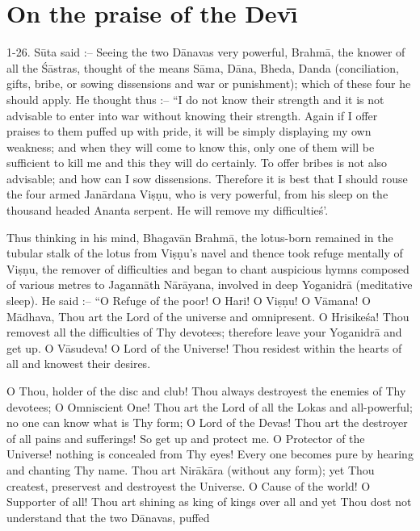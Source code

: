 \chapter{On the praise of the Dev\={\i}}

1-26. S\=uta said :-- Seeing the two D\=anavas very powerful, Brahm\=a, the knower of all the \'S\=astras, thought of the means S\=ama, D\=ana, Bheda, Danda (conciliation, gifts, bribe, or sowing dissensions and war or punishment); which of these four he should apply. He thought thus :-- ``I do not know their strength and it is not advisable to enter into war without knowing their strength. Again if I offer praises to them puffed up with pride, it will be simply displaying my own weakness; and when they will come to know this, only one of them will be sufficient to kill me and this they will do certainly. To offer bribes is not also advisable; and how can I sow dissensions. Therefore it is best that I should rouse the four armed Jan\=ardana Vi\d{s}\d{n}u, who is very powerful, from his sleep on the thousand headed Ananta serpent. He will remove my difficultie\'s'.

Thus thinking in his mind, Bhagav\=an Brahm\=a, the lotus-born remained in the tubular stalk of the lotus from Vi\d{s}\d{n}u's navel and thence took refuge mentally of Vi\d{s}\d{n}u, the remover of difficulties and began to chant auspicious hymns composed of various metres to Jagann\=ath N\=ar\=ayana, involved in deep Yoganidr\=a (meditative sleep). He said :-- ``O Refuge of the poor! O Hari! O Vi\d{s}\d{n}u! O V\=amana! O M\=adhava, Thou art the Lord of the universe and omnipresent. O Hrisike\'sa! Thou removest all the difficulties of Thy devotees; therefore leave your Yoganidr\=a and get up. O V\=asudeva! O Lord of the Universe! Thou residest within the hearts of all and knowest their desires.

O Thou, holder of the disc and club! Thou always destroyest the enemies of Thy devotees; O Omniscient One! Thou art the Lord of all the Lokas and all-powerful; no one can know what is Thy form; O Lord of the Devas! Thou art the destroyer of all pains and sufferings! So get up and protect me. O Protector of the Universe! nothing is concealed from Thy eyes! Every one becomes pure by hearing and chanting Thy name. Thou art Nir\=ak\=ara (without any form); yet Thou createst, preservest and destroyest the Universe. O Cause of the world! O Supporter of all! Thou art shining as king of kings over all and yet Thou dost not understand that the two D\=anavas, puffed

